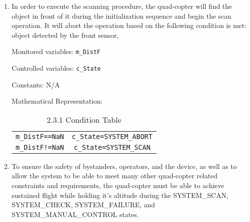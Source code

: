 \documentclass[10pt,letterpaper]{article}
\begin{document}
\begin{enumerate}[label=\textbf{MC\arabic*}]
	\item In order to execute the scanning procedure, the quad-copter will find the object in front of it during the initialization sequence and begin the scan operation. It will abort the operation based on the following condition is met: object detected by the front sensor, 
    
    Monitored variables: \texttt{m\_DistF} \par
    Controlled variables: \texttt{c\_State} \par
    Constants: N/A \par
    Mathematical Representation: \par
    \begin{table}[H] 
    \begin{adjustwidth}{-1.2in}{-1.2in}  
    \begin{center}
    \begin{tabular}{c c}
	\hline
	\sc{Condition} & \sc{Outcome} \\
	\hline
	\texttt{m\_DistF==NaN} & \texttt{c\_State=SYSTEM\_ABORT} \\
    \texttt{m\_DistF!=NaN} & \texttt{c\_State=SYSTEM\_SCAN} \\
	\end{tabular}
    \end{center}
    \caption[2.3.1 Condition Table]{2.3.1 Condition Table}
    \end{adjustwidth}
	\end{table} 
    
	\item To ensure the safety of bystanders, operators, and the device, as well as to allow the system to be able to meet many other quad-copter related constraints and requirements, the quad-copter must be able to achieve sustained flight while holding it's altitude during the SYSTEM\_SCAN, SYSTEM\_CHECK, SYSTEM\_FAILURE, and SYSTEM\_MANUAL\_CONTROL states. \par 
    

\end{enumerate}
\end{document}
